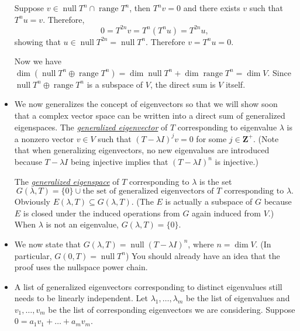\documentclass[11pt]{article}
\newcommand{\df}[1]{\ul{\textit{\textsf{#1}}}}
\newcommand{\Z}{\mathbf{Z}}
\newcommand{\n}{\operatorname{null}}
\renewcommand{\r}{\operatorname{range}}
\renewcommand{\d}{\dim}
\begin{document}
\begin{itemize}
    Suppose $v \in \n T^n \cap \r T^n$, then $T^n v= 0$ and there exists $v$ such that $T^n u=v$. Therefore, $$0 = T^{2n} v = T^n (T^n u) = T^{2n} u,$$ showing that $u \in \n T^{2n} = \n T^n$. Therefore $v = T^n u = 0$.
    
    Now we have $\d (\n T^n \oplus \r T^n) = \d\n T^n + \d\r T^n = \d V$. Since $\n T^n \oplus \r T^n$ is a subspace of $V$, the direct sum is $V$ itself.
    \item We now generalizes the concept of eigenvectors so that we will show soon that a complex vector space can be written into a direct sum of generalized eigenspaces. The \df{generalized eigenvector} of $T$ corresponding to eigenvalue $\lambda$ is a nonzero vector $v \in V$ such that $(T-\lambda I)^j v = 0$ for some $j \in \Z^+$. (Note that when generalizing eigenvectors, no new eigenvalues are introduced because $T - \lambda I$ being injective implies that $(T -\lambda I)^n$ is injective.)
    
    The \df{generalized eigenspace} of $T$ corresponding to $\lambda$ is the set $$G(\lambda, T) = \{0\} \cup \text{the set of generalized eigenvectors of $T$ corresponding to $\lambda$}.$$
    Obviously $E(\lambda, T) \subseteq G(\lambda, T)$. (The $E$ is actually a subspace of $G$ because $E$ is closed under the induced operations from $G$ again induced from $V$.) When $\lambda$ is not an eigenvalue, $G(\lambda, T) = \{0\}$.
    \item We now state that $G(\lambda, T) = \n (T - \lambda I)^n$, where $n = \d V$. (In particular, $G(0,T) = \n T^n$) You should already have an idea that the proof uses the nullspace power chain.
    \item A list of generalized eigenvectors corresponding to distinct eigenvalues still needs to be linearly independent. Let $\lambda_1,\dots,\lambda_m$ be the list of eigenvalues and $v_1,\dots,v_m$ be the list of corresponding eigenvectors we are considering. Suppose $0 = a_1v_1 + \dots + a_mv_m$.
    

\end{itemize}
\end{document}
